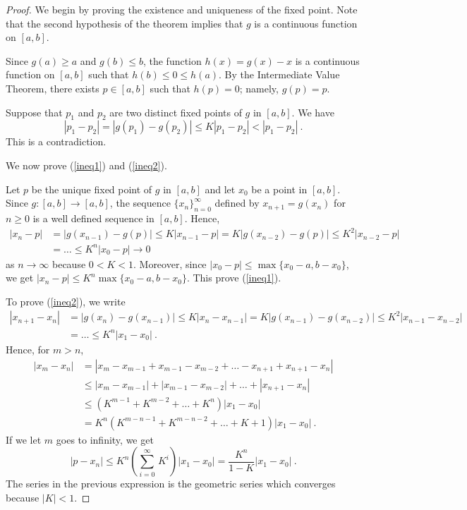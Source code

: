\begin{proof}
We begin by proving the existence and uniqueness of the fixed point.
Note that the second hypothesis of the theorem implies that $g$ is a
continuous function on $[a,b]$.

Since $g(a) \geq a$ and $g(b) \leq b$, the function $h(x) = g(x) -x$
is a continuous function on $[a,b]$ such that $h(b) \leq 0 \leq h(a)$.
By the Intermediate Value Theorem, there exists $p \in [a,b]$ such
that $h(p) = 0$; namely, $g(p) = p$.

Suppose that $p_1$ and $p_2$ are two distinct fixed points of $g$ in
$[a,b]$.  We have
\[
|p_1 -p_2| = |g(p_1) - g(p_2)| \leq K|p_1 - p_2| < |p_1 - p_2| \ .
\]
This is a contradiction.

\noindent We now prove (\ref{ineq1}) and (\ref{ineq2}).

Let $p$ be the unique fixed point of $g$ in $[a,b]$ and let $x_0$ be a
point in $[a,b]$.  Since $g:[a,b] \rightarrow [a,b]$, the sequence
$\{x_n\}_{n=0}^\infty$ defined by $x_{n+1} = g(x_n)$ for $n \geq 0$ is a
well defined sequence in $[a,b]$.  Hence,
\[
\begin{split}
|x_n -p| &= |g(x_{n-1}) - g(p)| \leq K |x_{n-1} - p|
= K |g(x_{n-2}) - g(p)| \leq K^2 |x_{n-2} -p| \\
&= \ldots \leq K^n |x_0 - p| \rightarrow 0
\end{split}
\]
as $n \rightarrow \infty$ because $0<K<1$.
Moreover, since $|x_0 -p| \leq \max\{x_0 -a, b-x_0\}$, we get
$|x_n -p| \leq K^n \max\{x_0 -a,b - x_0\}$.  This prove (\ref{ineq1}).

To prove (\ref{ineq2}), we write
\[
\begin{split}
|x_{n+1} -x_n| &= |g(x_n) - g(x_{n-1})| \leq K |x_n - x_{n-1}|
= K |g(x_{n-1}) - g(x_{n-2})| \leq K^2 |x_{n-1} -x_{n-2}|\\
&= \ldots \leq K^n |x_1 - x_0| \ .
\end{split}
\]
Hence, for $m > n$,
\[
\begin{split}
|x_m - x_n| &= |x_m - x_{m-1} + x_{m-1} - x_{m-2} + \ldots - x_{n+1} +
x_{n+1} - x_n | \\
&\leq |x_m - x_{m-1}| + |x_{m-1} - x_{m-2}| + \ldots + |x_{n+1} - x_n| \\
&\leq (K^{m-1} + K^{m-2} + \ldots + K^n)|x_1 - x_0|\\
&= K^n(K^{m-n-1} + K^{m-n-2} + \ldots + K + 1)|x_1 - x_0| \ .
\end{split}
\]
If we let $m$ goes to infinity, we get
\[
|p - x_n| \leq K^n\left( \sum_{i=0}^\infty \, K^i\right)|x_1 - x_0| =
\frac{K^n}{1-K} |x_1 - x_0| \ .
\]
The series in the previous expression is the geometric series which
converges because $|K|<1$.
\end{proof}

